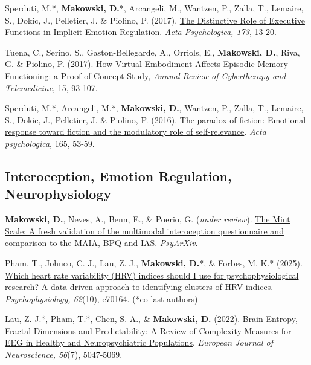 \documentclass[11pt,a4paper,]{awesome-cv}
\begin{document}
Sperduti, M.*, \textbf{Makowski, D.}*, Arcangeli, M., Wantzen, P.,
Zalla, T., Lemaire, S., Dokic, J., Pelletier, J. \& Piolino, P. (2017).
\href{https://dominiquemakowski.github.io/publication/sperduti2017distinctive/sperduti2017distinctive.pdf}{The
Distinctive Role of Executive Functions in Implicit Emotion Regulation}.
\emph{Acta Psychologica, 173}, 13-20.

Tuena, C., Serino, S., Gaston-Bellegarde, A., Orriols, E.,
\textbf{Makowski, D.}, Riva, G. \& Piolino, P. (2017).
\href{https://dominiquemakowski.github.io/publication/tuena2017virtual/tuena2017virtual.pdf}{How
Virtual Embodiment Affects Episodic Memory Functioning: a
Proof-of-Concept Study}, \emph{Annual Review of Cybertherapy and
Telemedicine}, 15, 93-107.

Sperduti, M.*, Arcangeli, M.*, \textbf{Makowski, D.}, Wantzen, P.,
Zalla, T., Lemaire, S., Dokic, J., Pelletier, J. \& Piolino, P. (2016).
\href{https://dominiquemakowski.github.io/publication/sperduti2016paradox/sperduti2016paradox.pdf}{The
paradox of fiction: Emotional response toward fiction and the modulatory
role of self-relevance}. \emph{Acta psychologica}, 165, 53-59.

\normalsize

\subsection{Interoception, Emotion Regulation,
Neurophysiology}\label{interoception-emotion-regulation-neurophysiology}

\scriptsize

\textbf{Makowski, D.}, Neves, A., Benn, E., \& Poerio, G. (\emph{under
review}). \href{https://doi.org/10.31234/osf.io/placeholder}{The Mint
Scale: A fresh validation of the multimodal interoception questionnaire
and comparison to the MAIA, BPQ and IAS}. \emph{PsyArXiv}.

Pham, T., Johnco, C. J., Lau, Z. J., \textbf{Makowski, D.}*, \& Forbes,
M. K.* (2025). \href{https://doi.org/10.1111/psyp.70164}{Which heart
rate variability (HRV) indices should I use for psychophysiological
research? A data-driven approach to identifying clusters of HRV
indices}. \emph{Psychophysiology, 62}(10), e70164. (*co-last authors)

Lau, Z. J.*, Pham, T.*, Chen, S. A., \& \textbf{Makowski, D.} (2022).
\href{https://onlinelibrary.wiley.com/doi/abs/10.1111/ejn.15800}{Brain
Entropy, Fractal Dimensions and Predictability: A Review of Complexity
Measures for EEG in Healthy and Neuropsychiatric Populations}.
\emph{European Journal of Neuroscience, 56}(7), 5047-5069.
\end{document}
